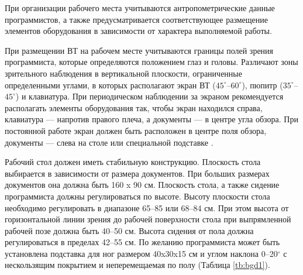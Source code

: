 \documentclass[12pt,a4paper]{report}
\begin{document}
При организации рабочего места учитываются антропометрические данные программистов, а также предусматривается соответствующее размещение элементов оборудования в зависимости от характера выполняемой работы.

При размещении ВТ на рабочем месте учитываются границы полей зрения программиста, которые определяются положением глаз и головы. Различают зоны зрительного наблюдения в вертикальной плоскости, ограниченные определенными углами, в которых располагают экран ВТ ($45^\circ$–$60^\circ$), пюпитр ($35^\circ$–$45^\circ$) и клавиатура. При периодическом наблюдении за экраном рекомендуется располагать элементы оборудования так, чтобы экран находился справа, клавиатура — напротив правого плеча, а документы — в центре угла обзора. При постоянной работе экран должен быть расположен в центре поля обзора, документы — слева на столе или специальной подставке \cite{bgd18}.

Рабочий стол должен иметь стабильную конструкцию. Плоскость стола выбирается в зависимости от размера документов. При больших размерах документов она должна быть 160 x 90 см. Плоскость стола, а также сидение программиста должны регулироваться по высоте. Высоту плоскости стола необходимо регулировать в диапазоне 65–85 или 68–84 см. При этом высота от горизонтальной линии зрения до рабочей поверхности стола при выпрямленной рабочей позе должна быть 40–50 см. Высота сидения от пола должна регулироваться в пределах 42–55 см. По желанию программиста может быть установлена подставка для ног размером 40x30x15 см и углом наклона 0–20$^\circ$ с нескользящим покрытием и неперемещаемая по полу (Таблица \ref{tb:bgd1}).
\end{document}

